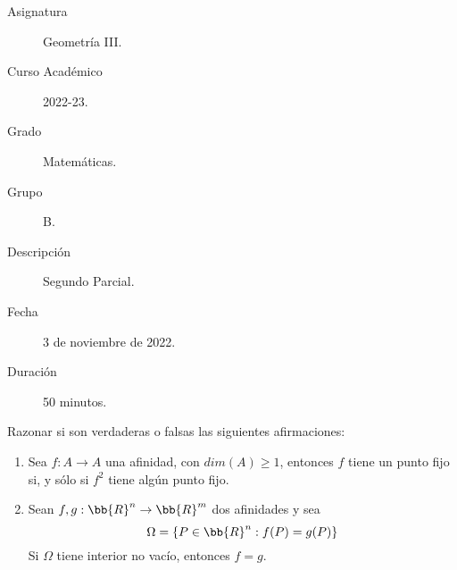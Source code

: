 \documentclass[12pt]{article}
\begin{document}

    
    

    
    \begin{description}
        \item[Asignatura] Geometría III.
        \item[Curso Académico] 2022-23.
        \item[Grado] Matemáticas.
        \item[Grupo] B.
        \item[Descripción] Segundo Parcial.
        \item[Fecha] 3 de noviembre de 2022.
        \item[Duración] 50 minutos.
    
    \end{description}
    \newpage

   \begin{ejercicio}[6 puntos]
        Razonar si son verdaderas o falsas las siguientes afirmaciones:
        \begin{enumerate}
            \item Sea $f:A\rightarrow A $ una afinidad, con $dim(A)\geq 1$, entonces $f$ tiene un punto fijo si, y sólo si $f^2$ tiene algún punto fijo.
            \item Sean $f,g:\bb{R}^n \rightarrow \bb{R}^m$ dos afinidades y sea
            \[
                \Omega = \{P \in \bb{R}^n : f(P)=g(P)\}
            \]
            Si $\Omega$ tiene interior no vacío, entonces $f=g$.
        \end{enumerate}
   \end{ejercicio}
\end{document}
